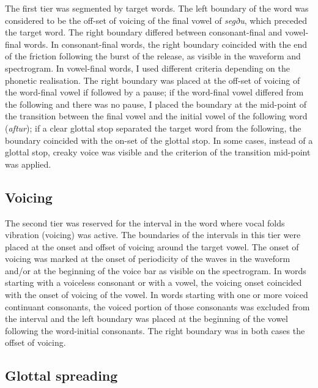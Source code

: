 \documentclass[11pt,a4paper,openany]{memoir}\usepackage[]{graphicx}\usepackage[]{color}
\begin{document}
The first tier was segmented by target words.
The left boundary of the word was considered to be the off-set of voicing of the final vowel of \textit{segðu}, which preceded the target word.
The right boundary differed between consonant-final and vowel-final words.
In consonant-final words, the right boundary coincided with the end of the friction following the burst of the release, as visible in the waveform and spectrogram.
In vowel-final words, I used different criteria depending on the phonetic realisation.
The right boundary was placed at the off-set of voicing of the word-final vowel if followed by a pause; if the word-final vowel differed from the following and there was no pause, I placed the boundary at the mid-point of the transition between the final vowel and the initial vowel of the following word (\textit{aftur}); if a clear glottal stop separated the target word from the following, the boundary coincided with the on-set of the glottal stop.
In some cases, instead of a glottal stop, creaky voice was visible and the criterion of the transition mid-point was applied.

\subsection{Voicing}

The second tier was reserved for the interval in the word where vocal folds vibration (voicing) was active.
The boundaries of the intervals in this tier were placed at the onset and offset of voicing around the target vowel.
The onset of voicing was marked at the onset of periodicity of the waves in the waveform and/or at the beginning of the voice bar as visible on the spectrogram.
In words starting with a voiceless consonant or with a vowel, the voicing onset coincided with the onset of voicing of the vowel.
In words starting with one or more voiced continuant consonants, the voiced portion of those consonants was excluded from the interval and the left boundary was placed at the beginning of the vowel following the word-initial consonants.
The right boundary was in both cases the offset of voicing.

\subsection{Glottal spreading}
\end{document}
